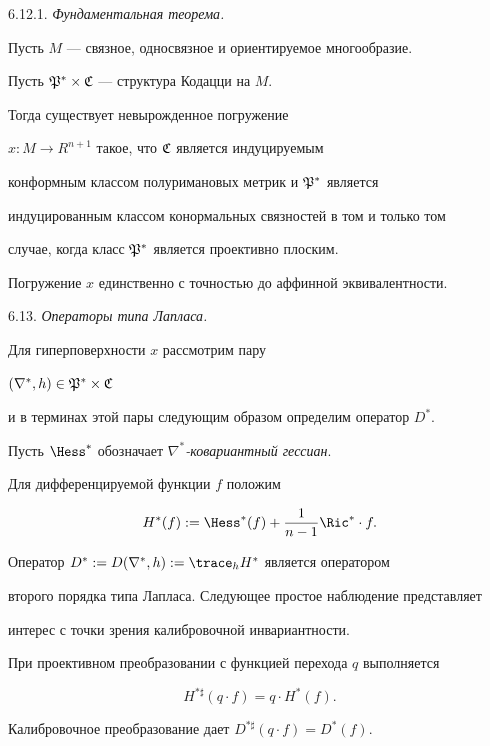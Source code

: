 \smallskip



6.12.1. {\it Фундаментальная теорема.}

Пусть $M$ --- связное, односвязное и ориентируемое многообразие.

Пусть $\frak P^* \times \frak C$ --- структура Кодацци на $M$.

Тогда существует невырожденное погружение

$x:M \to R^{n+1}$ такое, что $\frak C$ является индуцируемым

конформным классом полуримановых метрик и $\frak P^*$ является

индуцированным классом конормальных связностей в том и только том

случае, когда класс $\frak P^*$ является проективно плоским.

Погружение $x$ единственно с точностью до аффинной эквивалентности.

\medskip



6.13. {\it Операторы типа Лапласа.}

Для гиперповерхности $x$ рассмотрим пару

$(\nabla^*,h) \in \frak P^* \times \frak C$

и в терминах этой пары следующим образом определим оператор $D^*$.

Пусть $\Hess^*$ обозначает {\it $\nabla^*$-ковариантный гессиан}.

Для дифференцируемой функции $f$ положим

$$

H^*(f):= \Hess^*(f) + \frac {1}{n-1}\Ric^* \cdot f.

$$

Оператор $D^*:= D(\nabla^*,h):= \trace_h H^*$ является оператором

второго порядка типа Лапласа. Следующее простое наблюдение представляет 

интерес с точки зрения калибровочной инвариантности.

При проективном преобразовании с функцией перехода $q$ выполняется

$$

H^{* \sharp}(q \cdot f) = q \cdot H^*(f).

$$

Калибровочное преобразование дает $D^{*\sharp}(q \cdot f) = D^*(f)$.

\smallskip



